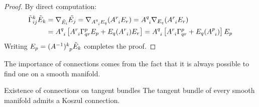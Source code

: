 \begin{proofbox}
  \begin{proof}
    By direct computation:
    \begin{equation*}
      \begin{split}
        \tilde{\Gamma}^k_{ij} \tilde{E}_k
        & = \na_{\tilde{E}_i} \tilde{E_j} = \na_{\tensor{A}{^q_i} E_q} (\tensor{A}{^r_i} E_r) = \tensor{A}{^q_i} \na_{E_q} (\tensor{A}{^r_i} E_r) \\
        & = \tensor{A}{^q_i} \left[ \tensor{A}{^r_i} \Gamma^p_{qr} E_p + E_q(\tensor{A}{^r_i}) E_r \right] = \tensor{A}{^q_i} \left[ \tensor{A}{^r_i} \Gamma^p_{qr} + E_q(\tensor{A}{^p_i}) \right] E_p
      \end{split}
    \end{equation*}
    Writing $ E_p = \tensor{(A^{-1})}{^k_p} \tilde{E}_k $ completes the proof.
  \end{proof}
\end{proofbox}

The importance of connections comes from the fact that it is always possible to find one on a smooth manifold.

\begin{theorem}{Existence of connections on tangent bundles}{}
  The tangent bundle of every smooth manifold admits a Koszul connection.
\end{theorem}

